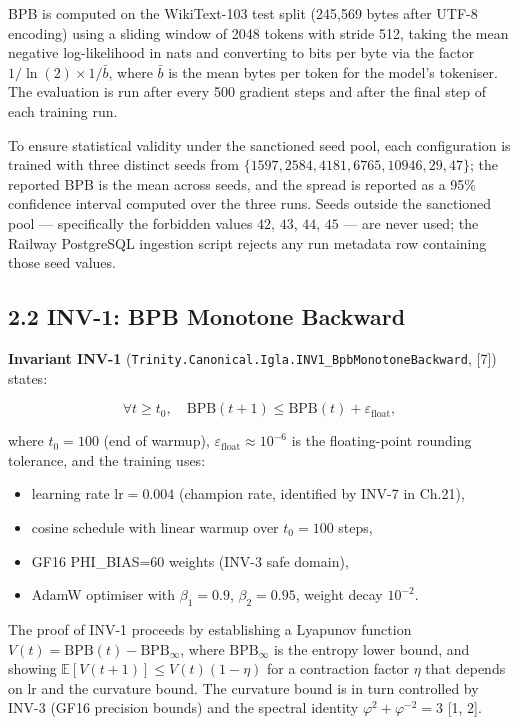 BPB is computed on the WikiText-103 test split
(245,569 bytes after UTF-8 encoding) using a
sliding window of 2048 tokens with stride 512,
taking the mean negative log-likelihood in nats
and converting to bits per byte via the factor
\(1/\ln(2) \times 1/\bar{b}\), where \(\bar{b}\)
is the mean bytes per token for the model's
tokeniser. The evaluation is run after every 500
gradient steps and after the final step of each
training run.

To ensure statistical validity under the
sanctioned seed pool, each configuration is
trained with three distinct seeds from
\(\{1597, 2584, 4181, 6765, 10946, 29, 47\}\); the
reported BPB is the mean across seeds, and the
spread is reported as a 95\% confidence interval
computed over the three runs. Seeds outside the
sanctioned pool --- specifically the forbidden
values \(42\), \(43\), \(44\), \(45\) --- are
never used; the Railway PostgreSQL ingestion script rejects any
run metadata row containing those seed values.

\subsection{2.2 INV-1: BPB Monotone
Backward}\label{fa_15:inv-1-bpb-monotone-backward}

\textbf{Invariant INV-1}
(\texttt{Trinity.Canonical.Igla.INV1\_BpbMonotoneBackward},
[7]) states:

\[\forall t \geq t_0,\quad \text{BPB}(t + 1) \leq \text{BPB}(t) + \varepsilon_{\text{float}}, \tag{1}\]

where \(t_0 = 100\) (end of warmup),
\(\varepsilon_{\text{float}} \approx 10^{-6}\) is
the floating-point rounding tolerance, and the
training uses:

\begin{itemize}
\tightlist
\item
  learning rate \(\text{lr} = 0.004\) (champion
  rate, identified by INV-7 in Ch.21),
\item
  cosine schedule with linear warmup over
  \(t_0 = 100\) steps,
\item
  GF16 PHI\_BIAS=60 weights (INV-3 safe domain),
\item
  AdamW optimiser with \(\beta_1 = 0.9\),
  \(\beta_2 = 0.95\), weight decay \(10^{-2}\).
\end{itemize}

The proof of INV-1 proceeds by establishing a
Lyapunov function
\(V(t) = \text{BPB}(t) - \text{BPB}_\infty\),
where \(\text{BPB}_\infty\) is the entropy lower
bound, and showing
\(\mathbb{E}[V(t+1)] \leq V(t)(1 - \eta)\) for a
contraction factor \(\eta\) that depends on
\(\text{lr}\) and the curvature bound. The
curvature bound is in turn controlled by INV-3
(GF16 precision bounds) and the spectral identity
\(\varphi^2 + \varphi^{-2} = 3\) [1, 2].

